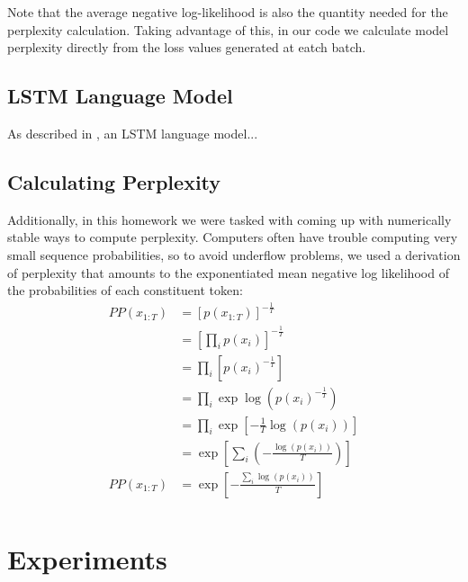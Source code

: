 \documentclass[11pt]{article}
\begin{document}
Note that the average negative log-likelihood is also the quantity needed for the perplexity calculation. Taking advantage of this, in our code we calculate model perplexity directly from the loss values generated at eatch batch.

\subsection{LSTM Language Model}

As described in \cite{zaremba2014recurrent}, an LSTM language model...

\subsection{Calculating Perplexity}

Additionally, in this homework we were tasked with coming up with numerically stable ways to compute perplexity. Computers often have trouble computing very small sequence probabilities, so to avoid underflow problems, we used a derivation of perplexity that amounts to the exponentiated mean negative log likelihood of the probabilities of each constituent token:
\begin{align*}
  PP(x_{1:T}) &= [p(x_{1:T})]^{-\frac{1}{T}} \\
  &= [\prod_{i} p(x_i)] ^{-\frac{1}{T}} \\
  &= \prod_{i} [p(x_i) ^{-\frac{1}{T}}] \\
  &= \prod_{i} \exp\log(p(x_i) ^{-\frac{1}{T}}) \\
  &= \prod_{i} \exp[-\frac{1}{T}  \log(p(x_i))]\\
  &= \exp[ \sum_{i}(
    -\frac{\log(p(x_i))}{T} 
  ) ]\\
  PP(x_{1:T}) &= \exp[
    -\frac{\sum_{i}{\log(p(x_i))}}{T} 
  ]\\
\end{align*}

\section{Experiments}
\end{document}
